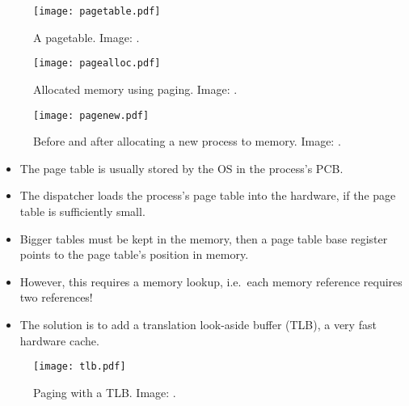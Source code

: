 \documentclass{beamer}
\begin{document}
\begin{frame}{\insertsubsectionhead}
  \begin{figure}
    \texttt{[image: pagetable.pdf]}
    \caption{A pagetable.
      Image: \cite{Silberschatz2013osc}.}
  \end{figure}
\end{frame}

\begin{frame}{\insertsubsectionhead}
  \begin{figure}
    \texttt{[image: pagealloc.pdf]}
    \caption{Allocated memory using paging.
      Image: \cite{Silberschatz2013osc}.}
  \end{figure}
\end{frame}

\begin{frame}{\insertsubsectionhead}
  \begin{figure}
    \texttt{[image: pagenew.pdf]}
    \caption{Before and after allocating a new process to memory.
      Image: \cite{Silberschatz2013osc}.}
  \end{figure}
\end{frame}

\begin{frame}{\insertsubsectionhead}
  \begin{itemize}
    \item The page table is usually stored by the OS in the process's PCB.

    \item The dispatcher loads the process's page table into the hardware, if 
      the page table is sufficiently small.
      
    \item Bigger tables must be kept in the memory, then a page table base 
      register points to the page table's position in memory.

    \item However, this requires a memory lookup, i.e.\ each memory reference 
      requires two references!

    \item The solution is to add a translation look-aside buffer (TLB), a very 
      fast hardware cache.

  \end{itemize}
\end{frame}

\begin{frame}{\insertsubsectionhead}
  \begin{figure}
    \texttt{[image: tlb.pdf]}
    \caption{Paging with a TLB.
      Image: \cite{Silberschatz2013osc}.}
  \end{figure}
\end{frame}
\end{document}
